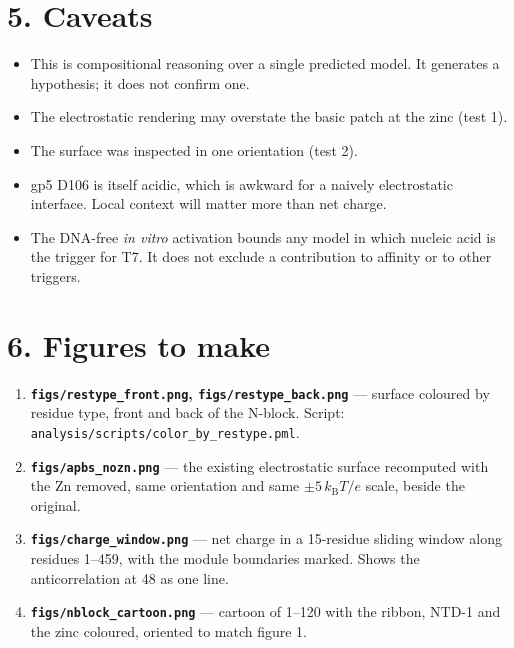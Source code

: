 \documentclass[11pt,a4paper]{article}
\begin{document}
\section*{5. Caveats}

\begin{itemize}[leftmargin=1.4em,itemsep=2pt]
  \item This is compositional reasoning over a single predicted model. It generates a hypothesis; it
        does not confirm one.
  \item The electrostatic rendering may overstate the basic patch at the zinc (test 1).
  \item The surface was inspected in one orientation (test 2).
  \item gp5 D106 is itself acidic, which is awkward for a naively electrostatic interface. Local
        context will matter more than net charge.
  \item The DNA-free \emph{in vitro} activation bounds any model in which nucleic acid is the trigger
        for T7. It does not exclude a contribution to affinity or to other triggers.
\end{itemize}

\section*{6. Figures to make}

\begin{enumerate}[leftmargin=1.6em,itemsep=2pt]
  \item \textbf{\texttt{figs/restype\_front.png}, \texttt{figs/restype\_back.png}} --- surface coloured
        by residue type, front and back of the N-block. Script:
        \texttt{analysis/scripts/color\_by\_restype.pml}.
  \item \textbf{\texttt{figs/apbs\_nozn.png}} --- the existing electrostatic surface recomputed with the
        Zn removed, same orientation and same $\pm 5\,k_{\mathrm{B}}T/e$ scale, beside the original.
  \item \textbf{\texttt{figs/charge\_window.png}} --- net charge in a 15-residue sliding window along
        residues 1--459, with the module boundaries marked. Shows the anticorrelation at 48 as one line.
  \item \textbf{\texttt{figs/nblock\_cartoon.png}} --- cartoon of 1--120 with the ribbon, NTD-1 and the
        zinc coloured, oriented to match figure 1.
\end{enumerate}
\end{document}
